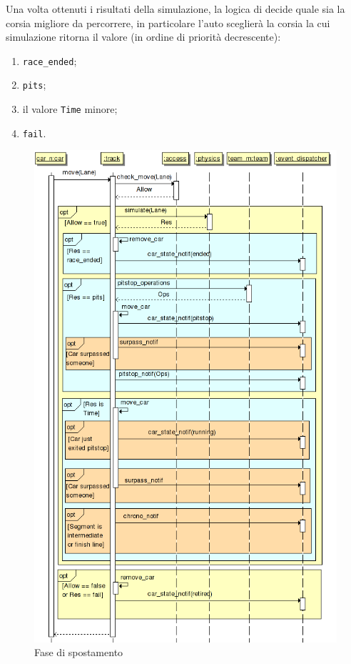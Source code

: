 Una volta ottenuti i risultati della simulazione, la logica di \car{} decide quale sia la corsia migliore da percorrere, in particolare l'auto sceglierà la corsia la cui simulazione ritorna il valore (in ordine di priorità decrescente):
\begin{enumerate}
\item \texttt{race\_ended};
\item \texttt{pits};
\item il valore \texttt{Time} minore;
\item \texttt{fail}.
\end{enumerate}

\begin{figure}
\includegraphics[width=\textwidth]{diagrammi/Move}
\caption{Fase di spostamento}
\label{fig:move}
\end{figure}

